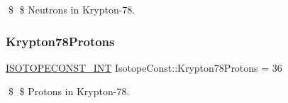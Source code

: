 \$ \$ Neutrons in Krypton-\/78. \mbox{\label{group___isotope_const-_krypton-_kr78_ga8924008b6abe9631e8ab23bd98ee031e}} 
\subsubsection{\texorpdfstring{Krypton78\+Protons}{Krypton78Protons}}
{\footnotesize\ttfamily \mbox{\hyperlink{group___isotope_const-_macros_ga5f18360b3e99483a35c32d789e62621c}{I\+S\+O\+T\+O\+P\+E\+C\+O\+N\+S\+T\+\_\+\+I\+NT}} Isotope\+Const\+::\+Krypton78\+Protons = 36}

\$ \$ Protons in Krypton-\/78. 